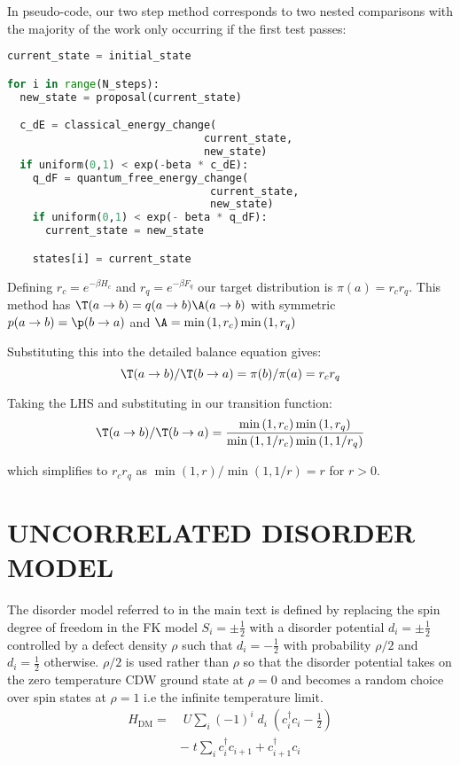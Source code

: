 In pseudo-code, our two step method corresponds to two nested comparisons with the majority of the work only occurring if the first test passes:

\begin{lstlisting}[language=Python]
current_state = initial_state

for i in range(N_steps):
  new_state = proposal(current_state)

  c_dE = classical_energy_change(
                               current_state,
                               new_state)
  if uniform(0,1) < exp(-beta * c_dE):
    q_dF = quantum_free_energy_change(
                                current_state,
                                new_state)
    if uniform(0,1) < exp(- beta * q_dF):
      current_state = new_state

    states[i] = current_state
\end{lstlisting}

Defining \(r_c = e^{-\beta H_c}\) and \(r_q = e^{-\beta F_q}\) our target distribution is \(\pi(a) = r_c r_q\). This method has \(\T(a\to b) = q(a\to b)\A(a \to b)\) with symmetric \(p(a \to b) = \p(b \to a)\) and \(\A = \min\left(1, r_c\right) \min\left(1, r_q\right)\) 

 Substituting this into the detailed balance equation gives: 
\[\T(a \to b)/\T(b \to a) = \pi(b)/\pi(a) = r_c r_q\]

Taking the LHS and substituting in our transition function:
\begin{align}
\T(a \to b)/\T(b \to a) = \frac{\min\left(1, r_c\right) \min\left(1, r_q\right)}{ \min\left(1, 1/r_c\right) \min\left(1, 1/r_q\right)}
\end{align}

which simplifies to \(r_c r_q\) as \(\min(1,r)/\min(1,1/r) = r\) for \(r > 0\). 

\section{\label{app:disorder_model}
UNCORRELATED DISORDER MODEL
}

The disorder model referred to in the main text is defined by replacing the spin degree of freedom in the FK model \(S_i = \pm \tfrac{1}{2}\) with a disorder potential \(d_i = \pm \tfrac{1}{2}\) controlled by a defect density \(\rho\) such that \(d_i = -\tfrac{1}{2}\) with probability \(\rho/2\) and \(d_i = \tfrac{1}{2}\) otherwise. \(\rho/2\) is used rather than \(\rho\) so that the disorder potential takes on the zero temperature CDW ground state at \(\rho = 0\) and becomes a random choice over spin states at \(\rho = 1\) i.e the infinite temperature limit.
~
\begin{align}
H_{\mathrm{DM}} = & \;U \sum_{i} (-1)^i \; d_i \;(c^\dag_{i}c_{i} - \tfrac{1}{2}) \\
& -\;t \sum_{i} c^\dag_{i}c_{i+1} + c^\dag_{i+1}c_{i} \nonumber
\end{align}